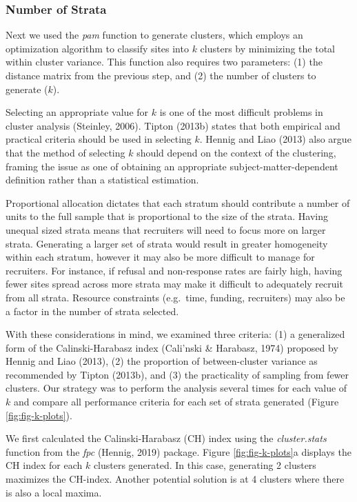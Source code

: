\documentclass[english,man,floatsintext]{apa6}
\begin{document}
\hypertarget{number-of-strata}{%
\subsubsection{Number of Strata}\label{number-of-strata}}

Next we used the \emph{pam} function to generate clusters, which employs an optimization algorithm to classify sites into \(k\) clusters by minimizing the total within cluster variance. This function also requires two parameters: (1) the distance matrix from the previous step, and (2) the number of clusters to generate (\(k\)).

Selecting an appropriate value for \(k\) is one of the most difficult problems in cluster analysis (Steinley, 2006). Tipton (2013b) states that both empirical and practical criteria should be used in selecting \(k\). Hennig and Liao (2013) also argue that the method of selecting \(k\) should depend on the context of the clustering, framing the issue as one of obtaining an appropriate subject-matter-dependent definition rather than a statistical estimation.

Proportional allocation dictates that each stratum should contribute a number of units to the full sample that is proportional to the size of the strata. Having unequal sized strata means that recruiters will need to focus more on larger strata. Generating a larger set of strata would result in greater homogeneity within each stratum, however it may also be more difficult to manage for recruiters. For instance, if refusal and non-response rates are fairly high, having fewer sites spread across more strata may make it difficult to adequately recruit from all strata. Resource constraints (e.g.~time, funding, recruiters) may also be a factor in the number of strata selected.

With these considerations in mind, we examined three criteria: (1) a generalized form of the Calinski-Harabasz index (Cali\a'nski \& Harabasz, 1974) proposed by Hennig and Liao (2013), (2) the proportion of between-cluster variance as recommended by Tipton (2013b), and (3) the practicality of sampling from fewer clusters. Our strategy was to perform the analysis several times for each value of \(k\) and compare all performance criteria for each set of strata generated (Figure \ref{fig:fig-k-plots}).

We first calculated the Calinski-Harabasz (CH) index using the \emph{cluster.stats} function from the \emph{fpc} (Hennig, 2019) package. Figure \ref{fig:fig-k-plots}a displays the CH index for each \(k\) clusters generated. In this case, generating 2 clusters maximizes the CH-index. Another potential solution is at 4 clusters where there is also a local maxima.
\end{document}
